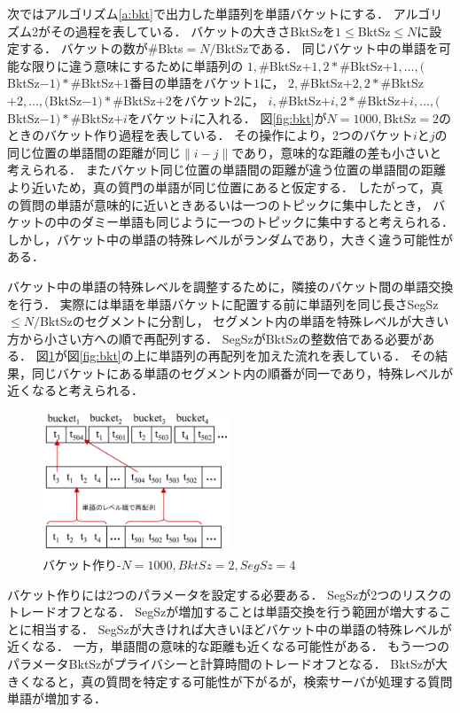 \documentclass[master]{suribt}
\theoremstyle{definition}
\begin{document}
 次ではアルゴリズム\ref{a:bkt}で出力した単語列を単語バケットにする．
 アルゴリズム2がその過程を表している．
 バケットの大きさBktSzを$1 \leq$BktSz$\leq N$に設定する．
 バケットの数が\#Bkts$=N/$BktSzである．
 同じバケット中の単語を可能な限りに違う意味にするために単語列の
 $1,\#$BktSz$+1,2*\#$BktSz$+1, \dots,($BktSz$-1)*\#$BktSz$+1$番目の単語をバケット$1$に，
 $2,\#$BktSz$+2,2*\#$BktSz$+2, \dots,($BktSz$-1)*\#$BktSz$+2$をバケット$2$に，
 $i,\#$BktSz$+i,2*\#$BktSz$+i, \dots,($BktSz$-1)*\#$BktSz$+i$をバケット$i$に入れる．
 図\ref{fig:bkt}が$N=1000,$BktSz$=2$のときのバケット作り過程を表している．
 その操作により，2つのバケット$i$と$j$の同じ位置の単語間の距離が同じ$\|i-j\|$であり，意味的な距離の差も小さいと考えられる．
 またバケット同じ位置の単語間の距離が違う位置の単語間の距離より近いため，真の質門の単語が同じ位置にあると仮定する．
 したがって，真の質問の単語が意味的に近いときあるいは一つのトピックに集中したとき，
 バケットの中のダミー単語も同じように一つのトピックに集中すると考えられる．
 しかし，バケット中の単語の特殊レベルがランダムであり，大きく違う可能性がある．

 バケット中の単語の特殊レベルを調整するために，隣接のバケット間の単語交換を行う．
 実際には単語を単語バケットに配置する前に単語列を同じ長さSegSz$\leq N/$BktSzのセグメントに分割し，
 セグメント内の単語を特殊レベルが大きい方から小さい方への順で再配列する．
 SegSzがBktSzの整数倍である必要がある．
 図\ref{fig:bkt2}が図\ref{fig:bkt}の上に単語列の再配列を加えた流れを表している．
 その結果，同じバケットにある単語のセグメント内の順番が同一であり，特殊レベルが近くなると考えられる．

 \begin{figure}
  \centering
  \includegraphics[width=0.5\textwidth,height=0.3\textwidth,natwidth=1600,natheight=1196]{rk13.png}
  \caption{バケット作り-$N=1000,BktSz=2,SegSz=4$}\label{fig:bkt2}
 \end{figure}

 バケット作りには2つのパラメータを設定する必要ある．
 SegSzが2つのリスクのトレードオフとなる．
 SegSzが増加することは単語交換を行う範囲が増大することに相当する．
 SegSzが大きければ大きいほどバケット中の単語の特殊レベルが近くなる．
 一方，単語間の意味的な距離も近くなる可能性がある．
 もう一つのパラメータBktSzがプライバシーと計算時間のトレードオフとなる．
 BktSzが大きくなると，真の質問を特定する可能性が下がるが，検索サーバが処理する質問単語が増加する．
 
\end{document}
